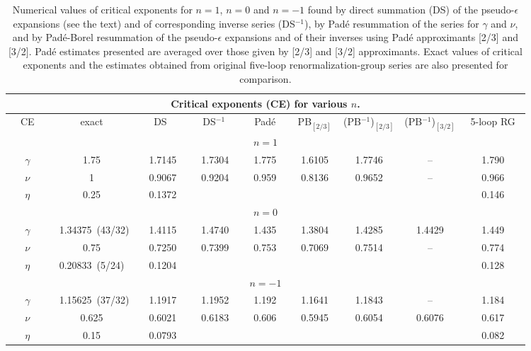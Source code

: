 \documentclass[aps,prb,preprint,showpacs,preprintnumbers,amsmath,amssymb]{revtex4}
\begin{document}
\begin{table}[t]
\caption{Numerical values of critical exponents for $n=1$, $n=0$ and $n=-1$ found
by direct summation (DS) of the pseudo-$\epsilon$ expansions (see the text) and
of corresponding inverse series (DS$^{-1}$), by Pad\'e resummation of the series
for $\gamma$ and $\nu$, and by Pad\'e-Borel resummation of the pseudo-$\epsilon$
expansions and of their inverses using Pad\'e approximants [2/3] and [3/2]. Pad\'e
estimates presented are averaged over those given by [2/3] and [3/2] approximants.
Exact values of critical exponents and the estimates obtained from original
five-loop renormalization-group series \cite{OS2000} are also presented for
comparison.}
\label{tab1}

\begin{tabular}{|*{9}{c|}}\hline
\multicolumn{9}{|c|}{Critical exponents (CE) for various $n$.} \\ \hline
~~CE~~ & exact & ~~DS~~ & ~DS$^{-1}~ $ & ~Pad\'e~ & PB$_{[2/3]}$ &
(PB$^{-1}$)$_{[2/3]}$ & (PB$^{-1}$)$_{[3/2]}$ &~5-loop RG~\\ \hline
\multicolumn{9}{|c|}{$n=1$} \\ \hline
$\gamma$ & 1.75 & ~~1.7145~ & ~~1.7304~ & ~~1.775~~ & ~1.6105~ & ~1.7746~ &
-- & ~1.790~ \\ \hline
$\nu$    & 1 & ~~0.9067~ & ~~0.9204~ & ~0.959~ & ~0.8136~ & ~0.9652~ & -- &
~0.966~ \\ \hline
$\eta$   & 0.25 & ~~0.1372~ &   &   &   &   &   & ~0.146~ \\ \hline
\multicolumn{9}{|c|}{$n=0$} \\ \hline
$\gamma$ & ~1.34375~(43/32) & ~~1.4115~ & ~~1.4740~ & ~~1.435~~ & ~1.3804~ &
~1.4285~ & ~1.4429~ & ~1.449~ \\ \hline
$\nu$    & 0.75 & ~~0.7250~ & ~~0.7399~ & ~~0.753~~ & ~0.7069~ & ~0.7514~ &
-- & ~0.774~ \\ \hline
$\eta$   & 0.20833~(5/24) & ~~0.1204~ &   &   &   &   &   & ~0.128~ \\ \hline
\multicolumn{9}{|c|}{$n=-1$} \\ \hline
$\gamma$ & ~1.15625~(37/32)& ~~1.1917~ & ~~1.1952~ & ~~1.192~~ & ~1.1641~ &
~1.1843~ & -- & ~1.184~ \\ \hline
$\nu$    & 0.625 & ~~0.6021~ & ~~0.6183~ & ~0.606~ & ~0.5945~ & ~0.6054~ &
~0.6076~ & ~0.617~ \\ \hline
$\eta$   & 0.15 & ~~0.0793~ &   &   &   &   &   & ~0.082~ \\ \hline
\end{tabular}
\end{table}
\end{document}

